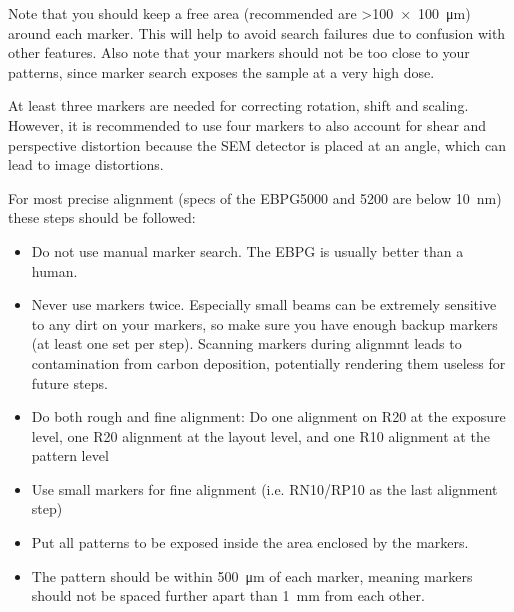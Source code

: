 Note that you should keep a free area (recommended are >\SI{100x100}{\micro\meter}) around each marker.
%
This will help to avoid search failures due to confusion with other features. 
%
Also note that your markers should not be too close to your patterns, since marker search exposes the sample at a very high dose.

At least three markers are needed for correcting rotation, shift and scaling. 
%
However, it is recommended to use four markers to also account for shear and perspective distortion because the SEM detector is placed at an angle, which can lead to image distortions.

For most precise alignment (specs of the EBPG5000 and 5200 are below \SI{10}{\nano\meter}) these steps should be followed:
%
\begin{itemize}
	\item Do not use manual marker search.
	The EBPG is usually better than a human.
	\item Never use markers twice. 
	Especially small beams can be extremely sensitive to any dirt on your markers, so make sure you have enough backup markers (at least one set per step).
	Scanning markers during alignmnt leads to contamination from carbon deposition, potentially rendering them useless for future steps.
	\item Do both rough and fine alignment: 
	Do one alignment on R20 at the exposure level, one R20 alignment at the layout level, and one R10 alignment at the pattern level
	\item Use small markers for fine alignment (i.e. RN10/RP10 as the last alignment step)
	\item Put all patterns to be exposed inside the area enclosed by the markers.
	\item The pattern should be within \SI{500}{\micro\meter} of each marker, meaning markers should not be spaced further apart than \SI{1}{\milli\meter} from each other.
\end{itemize}


